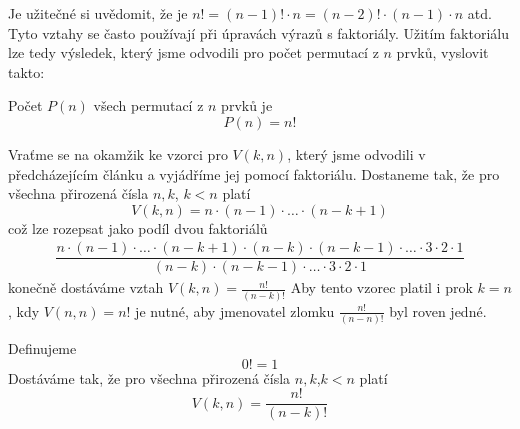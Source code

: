     Je užitečné si uvědomit, že je \(n! = (n-1)!\cdot n = (n-2)!\cdot(n-1)\cdot n\) atd. Tyto vztahy
    se často používají při úpravách výrazů s faktoriály. Užitím faktoriálu lze tedy výsledek, který
    jsme odvodili pro počet permutací z \(n\) prvků, vyslovit takto:
    \begin{mdframed}[style=highlight] Počet \(P(n)\) všech permutací z \(n\) prvků je
      \begin{equation*}
        P(n) = n!
      \end{equation*}
    \end{mdframed}

    Vraťme se na okamžik ke vzorci pro \(V(k,n)\), který jsme odvodili v předcházejícím článku a
    vyjádříme jej pomocí faktoriálu. Dostaneme tak, že pro všechna přirozená čísla \(n, k\), \(k<n\)
    platí
    \begin{equation*}
      V(k, n) = n\cdot(n-1)\cdot\ldots\cdot(n-k+1) 
    \end{equation*}
    což lze rozepsat jako podíl dvou faktoriálů
    \begin{gather*}
      \dfrac{n\cdot(n-1)\cdot\ldots\cdot(n-k+1)
              \cdot(n-k)\cdot(n-k-1)\cdot\ldots\cdot3\cdot2\cdot1}
                  {(n-k)\cdot(n-k-1)\cdot\ldots\cdot3\cdot2\cdot1}  
    \end{gather*}                    
    konečně dostáváme vztah \(V(k, n) = \frac{n!}{(n-k)!}\)
    \vspace{2em}
    Aby tento vzorec platil i prok \(k=n\), kdy \(V(n,n) = n!\) je nutné, aby jmenovatel zlomku
    \(\frac{n!}{(n-n)!}\) byl roven jedné.
    \begin{mdframed}[style=highlight] Definujeme
      \begin{equation*}
        0! = 1
      \end{equation*}
      Dostáváme tak, že pro všechna přirozená čísla \(n, k\),\(k<n\) platí
      \begin{equation*}
        V(k,n) = \dfrac{n!}{(n-k)!}
      \end{equation*}
    \end{mdframed}
    
      

